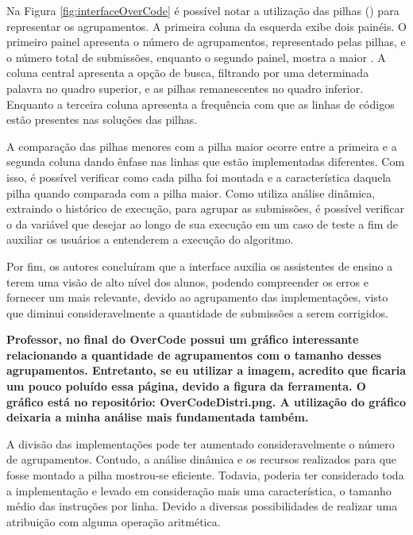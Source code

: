 		Na Figura \ref{fig:interfaceOverCode} é possível notar a utilização das pilhas
		() para representar os agrupamentos. A primeira coluna da
		esquerda exibe dois painéis. O primeiro painel apresenta o número de
		agrupamentos, representado pelas pilhas, e o número total de submissões,
		enquanto o segundo painel, mostra a maior . A coluna central
		apresenta a opção de busca, filtrando por uma determinada palavra no quadro
		superior, e as pilhas remanescentes no quadro inferior. Enquanto a terceira
		coluna apresenta a frequência com que as linhas de códigos estão presentes
		nas soluções das pilhas.

		A comparação das pilhas menores com a pilha maior ocorre entre a primeira e a
	    segunda coluna dando ênfase nas linhas que estão implementadas diferentes. Com
	    isso, é possível verificar como cada pilha foi montada e a característica daquela
	    pilha quando comparada com a pilha maior. Como utiliza análise dinâmica, extraindo
	    o histórico de execução, para agrupar as submissões, é possível verificar o 
	    da variável que desejar ao longo de sua execução em um caso de teste a fim de
	    auxiliar os usuários a entenderem a execução do algoritmo.

	    Por fim, os autores concluíram que a interface auxilia os assistentes de
	    ensino a terem uma visão de alto nível dos alunos, podendo compreender os
	    erros e fornecer um  mais relevante, devido ao agrupamento
	    das implementações, visto que diminui consideravelmente a quantidade de
	    submissões a serem corrigidos.
	    
	    \textbf{Professor, no final do OverCode possui um gráfico interessante relacionando
	    	a quantidade de agrupamentos com o tamanho desses agrupamentos. Entretanto, se
	    	eu utilizar a imagem, acredito que ficaria um pouco poluído essa página, devido
	    	a figura da ferramenta. O gráfico está no repositório: OverCodeDistri.png. A
	    	utilização do gráfico deixaria a minha análise mais fundamentada também.}
	    
	    A divisão das implementações pode ter aumentado consideravelmente o número de
	    agrupamentos. Contudo, a análise dinâmica e os recursos realizados para que
	    fosse montado a pilha mostrou-se eficiente. Todavia, poderia ter considerado
	    toda a implementação e levado em consideração mais uma característica, o tamanho
	    médio das instruções por linha. Devido a diversas possibilidades de realizar
	    uma atribuição com alguma operação aritmética.
	    

